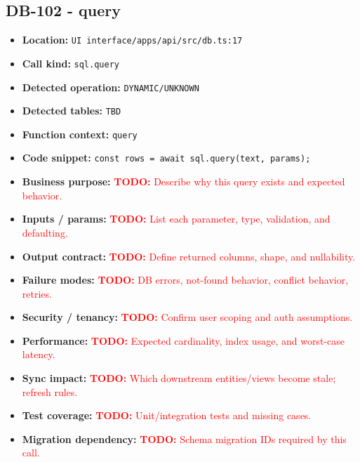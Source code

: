 \documentclass[11pt]{article}
\newcommand{\todoitem}[1]{\textcolor{red}{\textbf{TODO:} #1}}
\begin{document}
\subsection{DB-102 - query}
\begin{itemize}[leftmargin=1.5em]
\item \textbf{Location:} \texttt{UI interface/apps/api/src/db.ts:17}
\item \textbf{Call kind:} \texttt{sql.query}
\item \textbf{Detected operation:} \texttt{DYNAMIC/UNKNOWN}
\item \textbf{Detected tables:} \texttt{TBD}
\item \textbf{Function context:} \texttt{query}
\item \textbf{Code snippet:} \texttt{const rows = await sql.query(text, params);}
\item \textbf{Business purpose:} \todoitem{Describe why this query exists and expected behavior.}
\item \textbf{Inputs / params:} \todoitem{List each parameter, type, validation, and defaulting.}
\item \textbf{Output contract:} \todoitem{Define returned columns, shape, and nullability.}
\item \textbf{Failure modes:} \todoitem{DB errors, not-found behavior, conflict behavior, retries.}
\item \textbf{Security / tenancy:} \todoitem{Confirm user scoping and auth assumptions.}
\item \textbf{Performance:} \todoitem{Expected cardinality, index usage, and worst-case latency.}
\item \textbf{Sync impact:} \todoitem{Which downstream entities/views become stale; refresh rules.}
\item \textbf{Test coverage:} \todoitem{Unit/integration tests and missing cases.}
\item \textbf{Migration dependency:} \todoitem{Schema migration IDs required by this call.}
\end{itemize}
\end{document}

